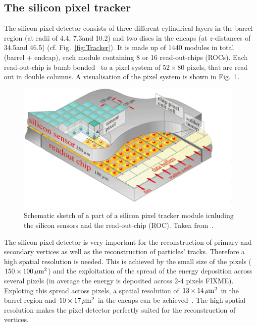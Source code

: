 \subsection*{The silicon pixel tracker}
The silicon pixel detector consists of three different cylindrical layers in the barrel region (at radii of 4.4\cm, 7.3\cm and 10.2\cm) and two discs in the encaps (at $z$-distances of 34.5\cm and 46.5\cm) (cf. Fig.~\ref{fig:Tracker}).
It is made up of 1440 modules in total (barrel + endcap), each module containing 8 or 16 read-out-chips (ROCs).
Each read-out-chip is bumb bonded~\cite{FIXME} to a pixel system of $52\times80$ pixels, that are read out in double columns.
A visualisation of the pixel system is shown in Fig.~\ref{fig:PixelTracker}.
\begin{figure}[!t]
  \centering
      \includegraphics[width=0.99\textwidth]{figures/experiment/CMS/Pixelement.png}
  \caption{Schematic sketch of a part of a silicon pixel tracker module icnluding the silicon sensors and the read-out-chip (ROC). Taken from~\cite{bib:CMS:tracking_8TeV}.}  
  \label{fig:PixelTracker}
\end{figure}

The silicon pixel detector is very important for the reconstruction of primary and secondary vertices as well as the reconstruction of particles' tracks.
Therefore a high spatial resolution is needed.
This is achieved by the small size of the pixels ($ 150 \times 100 \,\mu\text{m}^2$) and the exploitation of the spread of the energy deposition across several pixels (in average the energy is deposited across 2-4 pixels FIXME).
Exploting this spread across pixels, a spatial resolution of $13\times14\,\mu\text{m}^2$ in the barrel region and $10\times17\,\mu\text{m}^2$ in the encaps can be achieved~\cite{FIXME}. 
The high spatial resolution makes the pixel detector perfectly suited for the reconstruction of vertices.

